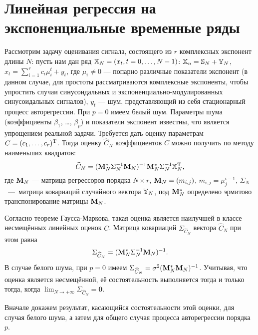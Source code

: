\documentclass[12pt,a4paper]{article}
\begin{document}
\section{Линейная регрессия на экспоненциальные временные ряды}
Рассмотрим задачу оценивания сигнала, состоящего из $r$ комплексных экспонент длины $N$: пусть нам дан ряд $\mathbb{X}_N = (x_t, t = 0, \ldots, N-1)$: $\mathbb{X}_n = \mathbb{S}_N + \mathbb{Y}_N$, $x_t = \sum_{i=1}^r c_i \mu_i^t + y_t$, где $\mu_i \ne 0$ --- попарно различные показатели экспонент (в данном случае, для простоты рассматриваются комплексные экспоненты, чтобы упростить случаи синусоидальных и экспоненциально-модулированных синусоидальных сигналов), $y_t$ --- шум, представляющий из себя стационарный процесс авторегрессии. При $p = 0$ имеем белый шум. Параметры шума (коэффициенты $\beta_1$, \ldots, $\beta_p$) и показатели экспонент известны, что является упрощением реальной задачи. Требуется дать оценку параметрам $C = (c_1, \ldots, c_r)^{\mathrm{T}}$. Тогда оценку $\widehat C_N$ коэффициентов $C$ можно получить по методу наименьших квадратов:
\begin{equation*}
\widehat C_N = (\mathbf{M}_N^* \Sigma_N^{-1} \mathbf{M}_N)^{-1}\mathbf{M}_N^* \Sigma_N^{-1} \mathbb{X}_N^{\mathrm{T}},
\end{equation*}
где $\mathbf{M}_N$ --- матрица регрессоров порядка $N \times r$, $\mathbf{M}_N = (m_{i, j})$, $m_{i, j} = \mu_j^{i- 1}$, $\Sigma_N$~---~матрица ковариаций случайного вектора $\mathbb{Y}_N$, под $\mathbf{M}_N^*$ определено эрмитово транспонирование матрицы $\mathbf{M}_N$.

Согласно теореме Гаусса-Маркова, такая оценка является наилучшей в классе несмещённых линейных оценок $C$. Матрица ковариаций $\Sigma_{\widehat C_N}$ вектора $\widehat C_N$ при этом равна
\begin{equation*}
\Sigma_{\widehat C_N} = (\mathbf{M}_N^* \Sigma_N^{-1} \mathbf{M}_N)^{-1}.
\end{equation*}
В случае белого шума, при $p = 0$ имеем $\Sigma_{\widehat C_N} = \sigma^2 (\mathbf{M}_N^* \mathbf{M}_N)^{-1}$. Учитывая, что оценка является несмещённой, её состоятельность выполняется тогда и только тогда, когда $ \lim_{N \to +\infty} \Sigma_{\widehat C_N} = \mathbf{0}$.

Вначале докажем результат, касающийся состоятельности этой оценки, для случая белого шума, а затем для общего случая процесса авторегрессии порядка $p$.
\end{document}
